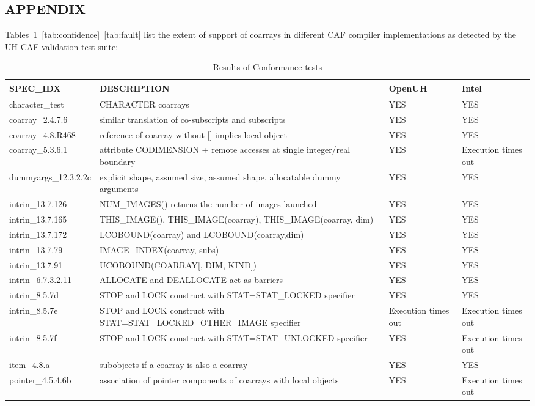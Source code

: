 \subsection{APPENDIX}

Tables~\ref{tab:conformance}~\ref{tab:confidence}~\ref{tab:fault} list the extent of support of coarrays in different CAF compiler implementations as detected by the UH CAF validation test suite:

\begin{table}[tbh!]
\caption{Results of Conformance tests}
\label{tab:conformance}
\begin{tabular}{|l|p{8cm}|p{1.5cm}|p{1.5cm}|}
\hline
SPEC\_IDX              &  DESCRIPTION  & OpenUH & Intel \\\hline
character\_test        &  CHARACTER coarrays & YES & YES \\\hline
coarray\_2.4.7.6       &  similar translation of co-subscripts and subscripts & YES & YES \\\hline
coarray\_4.8.R468      &  reference of coarray without [] implies local object & YES & YES \\\hline
coarray\_5.3.6.1       &  attribute CODIMENSION + remote accesses at single integer/real boundary & YES & Execution times out \\\hline
dummyargs\_12.3.2.2c   &  explicit shape, assumed size, assumed shape, allocatable dummy arguments & YES & YES \\\hline
intrin\_13.7.126       &  NUM\_IMAGES() returns the number of images launched & YES & YES \\\hline
intrin\_13.7.165       &  THIS\_IMAGE(), THIS\_IMAGE(coarray), THIS\_IMAGE(coarray, dim) & YES & YES \\\hline
intrin\_13.7.172       &  LCOBOUND(coarray) and LCOBOUND(coarray,dim) & YES & YES \\\hline
intrin\_13.7.79        &  IMAGE\_INDEX(coarray, subs) & YES & YES \\\hline
intrin\_13.7.91        &  UCOBOUND(COARRAY[, DIM, KIND]) & YES & YES \\\hline
intrin\_6.7.3.2.11     &  ALLOCATE and DEALLOCATE act as barriers & YES & YES \\\hline
intrin\_8.5.7d         &  STOP and LOCK construct with STAT=STAT\_LOCKED specifier & YES & YES \\\hline
intrin\_8.5.7e         &  STOP and LOCK construct with STAT=STAT\_LOCKED\_OTHER\_IMAGE specifier & Execution times out & Execution times out \\\hline
intrin\_8.5.7f         &  STOP and LOCK construct with STAT=STAT\_UNLOCKED specifier & YES & Execution times out \\\hline
item\_4.8.a            &  subobjects if a coarray is also a coarray & YES & YES \\\hline
pointer\_4.5.4.6b      &  association of pointer components of coarrays with local objects & YES & Execution times out \\\hline
\end{tabular}
\end{table}

